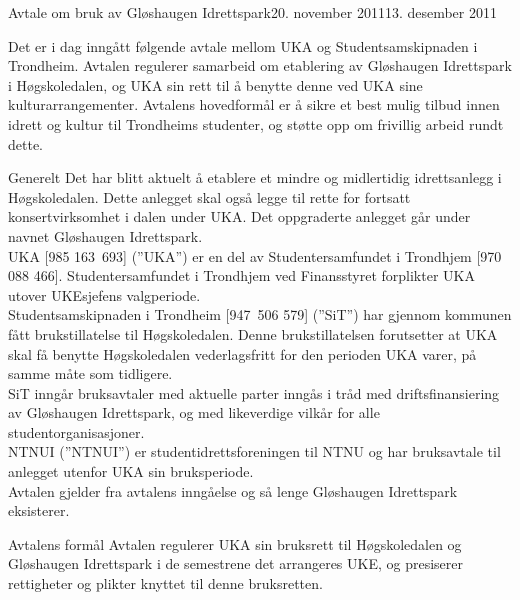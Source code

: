 \begin{instruks}{Avtale om bruk av Gløshaugen Idrettspark}{20. november 2011}{13. desember 2011}



Det er i dag inngått følgende avtale mellom UKA og Studentsamskipnaden i Trondheim. Avtalen regulerer samarbeid om etablering av Gløshaugen Idrettspark i Høgskoledalen, og UKA sin rett til å benytte denne ved UKA sine kulturarrangementer. Avtalens hovedformål er å sikre et best mulig tilbud innen idrett og kultur til Trondheims studenter, og støtte opp om frivillig arbeid rundt dette.


\begin{instruksledd}{Generelt} 
Det har blitt aktuelt å etablere et mindre og midlertidig idrettsanlegg i Høgskoledalen. Dette anlegget skal også legge til rette for fortsatt konsertvirksomhet i dalen under UKA.  Det oppgraderte anlegget går under navnet Gløshaugen Idrettspark.\\ 

UKA [985 163 693] (”UKA”) er en del av Studentersamfundet i Trondhjem [970 088 466]. Studentersamfundet i Trondhjem ved Finansstyret forplikter UKA utover UKEsjefens valgperiode.\\

Studentsamskipnaden i Trondheim [947 506 579] (”SiT”) har gjennom kommunen fått brukstillatelse til Høgskoledalen. Denne brukstillatelsen forutsetter at UKA skal få benytte Høgskoledalen vederlagsfritt for den perioden UKA varer, på samme måte som tidligere.\\  

SiT inngår bruksavtaler med aktuelle parter inngås i tråd med driftsfinansiering av Gløshaugen Idrettspark, og med likeverdige vilkår for alle studentorganisasjoner.\\

NTNUI (”NTNUI”) er studentidrettsforeningen til NTNU og har bruksavtale til anlegget utenfor UKA sin bruksperiode.\\

Avtalen gjelder fra avtalens inngåelse og så lenge Gløshaugen Idrettspark eksisterer.\\
\end{instruksledd}
 
\begin{instruksledd}{Avtalens formål}
Avtalen regulerer UKA sin bruksrett til Høgskoledalen og Gløshaugen Idrettspark i de semestrene det arrangeres UKE, og presiserer rettigheter og plikter knyttet til denne bruksretten.\\
\end{instruksledd}
 

\end{instruks}
